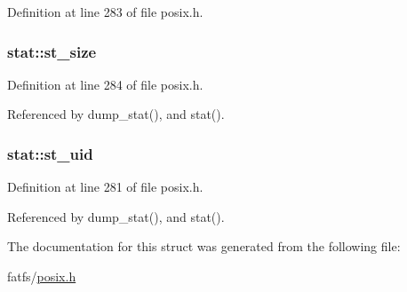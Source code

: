 Definition at line 283 of file posix.\-h.

\hypertarget{structstat_a040e19c8b9766f841fde8786ce9297bf}{
\subsubsection[{st\-\_\-size}]{ stat\-::st\-\_\-size}}\label{structstat_a040e19c8b9766f841fde8786ce9297bf}


Definition at line 284 of file posix.\-h.



Referenced by dump\-\_\-stat(), and stat().

\hypertarget{structstat_a4a8708a3d18be60ee7b2f06c4cab0c70}{
\subsubsection[{st\-\_\-uid}]{ stat\-::st\-\_\-uid}}\label{structstat_a4a8708a3d18be60ee7b2f06c4cab0c70}


Definition at line 281 of file posix.\-h.



Referenced by dump\-\_\-stat(), and stat().



The documentation for this struct was generated from the following file\-:\begin{DoxyCompactItemize}
\item 
fatfs/\hyperlink{posix_8h}{posix.\-h}\end{DoxyCompactItemize}
